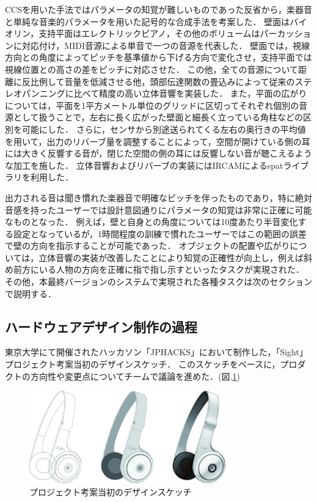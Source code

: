 CCSを用いた手法ではパラメータの知覚が難しいものであった反省から，楽器音と単純な音楽的パラメータを用いた記号的な合成手法を考案した．
壁面はバイオリン，支持平面はエレクトリックピアノ，その他のボリュームはパーカッションに対応付け，MIDI音源による単音で一つの音源を代表した．
壁面では，視線方向との角度によってピッチを基準値から下げる方向で変化させ，支持平面では視線位置との高さの差をピッチに対応させた．
この他，全ての音源について距離に反比例して音量を低減させる他，頭部伝達関数の畳込みによって従来のステレオパンニングに比べて精度の高い立体音響を実装した．
また，平面の広がりについては，平面を1平方メートル単位のグリッドに区切ってそれぞれ個別の音源として扱うことで，左右に長く広がった壁面と細長く立っている角柱などの区別を可能にした．
さらに，センサから別途送られてくる左右の奥行きの平均値を用いて，出力のリバーブ量を調整することによって，空間が開けている側の耳には大きく反響する音が，閉じた空間の側の耳には反響しない音が聴こえるような加工を施した．
立体音響およびリバーブの実装にはIRCAMによるspatライブラリを利用した．

出力される音は聞き慣れた楽器音で明確なピッチを伴ったものであり，特に絶対音感を持ったユーザーでは設計意図通りにパラメータの知覚は非常に正確に可能なものとなった．
例えば，壁と自身との角度については10度あたり半音変化する設定となっているが，1時間程度の訓練で慣れたユーザーではこの範囲の誤差で壁の方向を指示することが可能であった．
オブジェクトの配置や広がりについては，立体音響の実装が改善したことにより知覚の正確性が向上し，例えば斜め前方にいる人物の方向を正確に指で指し示すといったタスクが実現された．
その他，本最終バージョンのシステムで実現された各種タスクは次のセクションで説明する．

\subsection{ハードウェアデザイン制作の過程}

東京大学にて開催されたハッカソン「JPHACKS」において制作した，「Sight」プロジェクト考案当初のデザインスケッチ．
このスケッチをベースに，プロダクトの方向性や変更点についてチームで議論を進めた．(図.\ref{fig:design_1})

\begin{figure}[h]
\begin{center}
\includegraphics[height=40mm]{images/hardware/design_1.jpg}
\end{center}
\caption{プロジェクト考案当初のデザインスケッチ}
\label{fig:design_1}
\end{figure}

